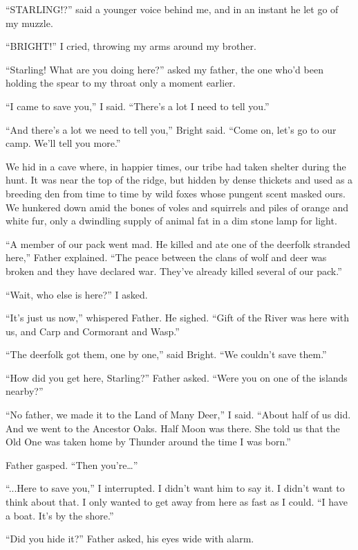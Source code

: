 ``STARLING!?'' said a younger voice behind me, and in an instant he let go of my muzzle.

``BRIGHT!'' I cried, throwing my arms around my brother.

``Starling! What are you doing here?'' asked my father, the one who'd been holding the spear to my throat only a moment earlier.

``I came to save you,'' I said. ``There's a lot I need to tell you.''

``And there's a lot we need to tell you,'' Bright said. ``Come on, let's go to our camp. We'll tell you more.''

\secdiv

\noindent We hid in a cave where, in happier times, our tribe had taken shelter during the hunt. It was near the top of the ridge, but hidden by dense thickets and used as a breeding den from time to time by wild foxes whose pungent scent masked ours. We hunkered down amid the bones of voles and squirrels and piles of orange and white fur, only a dwindling supply of animal fat in a dim stone lamp for light.

``A member of our pack went mad. He killed and ate one of the deerfolk stranded here,'' Father explained. ``The peace between the clans of wolf and deer was broken and they have declared war. They've already killed several of our pack.''

``Wait, who else is here?'' I asked.

``It's just us now,'' whispered Father. He sighed. ``Gift of the River was here with us, and Carp and Cormorant and Wasp.''

``The deerfolk got them, one by one,'' said Bright. ``We couldn't save them.''

``How did you get here, Starling?'' Father asked. ``Were you on one of the islands nearby?''

``No father, we made it to the Land of Many Deer,'' I said. ``About half of us did. And we went to the Ancestor Oaks. Half Moon was there. She told us that the Old One was taken home by Thunder around the time I was born.''

Father gasped. ``Then you're\ldots''

``...Here to save you,'' I interrupted. I didn't want him to say it. I didn't want to think about that. I only wanted to get away from here as fast as I could. ``I have a boat. It's by the shore.''

``Did you hide it?'' Father asked, his eyes wide with alarm.

